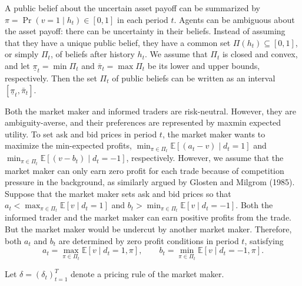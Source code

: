 \documentclass[12pt,a4paper]{article}
\newenvironment{original}{%
  \par\vspace{4pt}\noindent%
  \color{black}%
  \ignorespaces
}{%
  \par\vspace{2pt}%
}
\begin{document}
\begin{original}
A public belief about the uncertain asset payoff can be summarized by $\pi = \Pr(v = 1 \mid h_t) \in [0, 1]$ in each period $t$. Agents can be ambiguous about the asset payoff: there can be uncertainty in their beliefs. Instead of assuming that they have a unique public belief, they have a common set $\Pi(h_t) \subseteq [0, 1]$, or simply $\Pi_t$, of beliefs after history $h_t$. We assume that $\Pi_t$ is closed and convex, and let $\underline{\pi}_t = \min \Pi_t$ and $\bar{\pi}_t = \max \Pi_t$ be its lower and upper bounds, respectively. Then the set $\Pi_t$ of public beliefs can be written as an interval $[\underline{\pi}_t, \bar{\pi}_t]$.

Both the market maker and informed traders are risk-neutral. However, they are ambiguity-averse, and their preferences are represented by maxmin expected utility. To set ask and bid prices in period $t$, the market maker wants to maximize the min-expected profits, $\min_{\pi \in \Pi_t} \mathbb{E}[(a_t - v) \mid d_t = 1]$ and $\min_{\pi \in \Pi_t} \mathbb{E}[(v - b_t) \mid d_t = -1]$, respectively. However, we assume that the market maker can only earn zero profit for each trade because of competition pressure in the background, as similarly argued by Glosten and Milgrom (1985). Suppose that the market maker sets ask and bid prices so that $a_t < \max_{\pi \in \Pi_t} \mathbb{E}[v \mid d_t = 1]$ and $b_t > \min_{\pi \in \Pi_t} \mathbb{E}[v \mid d_t = -1]$. Both the informed trader and the market maker can earn positive profits from the trade. But the market maker would be undercut by another market maker. Therefore, both $a_t$ and $b_t$ are determined by zero profit conditions in period $t$, satisfying
\[
a_t = \max_{\pi \in \Pi_t} \mathbb{E}[v \mid d_t = 1, \pi], \qquad
b_t = \min_{\pi \in \Pi_t} \mathbb{E}[v \mid d_t = -1, \pi]. \tag{2.1, 2.2}
\]

Let $\delta = (\delta_t)_{t=1}^{T}$ denote a pricing rule of the market maker.
\end{original}
\end{document}
